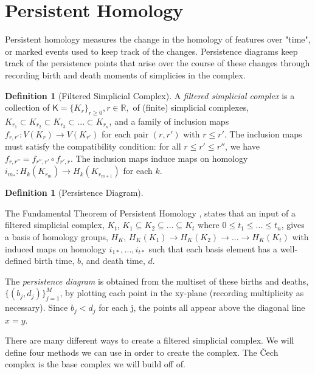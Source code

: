 \documentclass[ma]{uncgdissertationexp}
\theoremstyle{plain}
\theoremstyle{definition}
\newtheorem{definition}[theorem]{Definition}
\theoremstyle{remark}
\begin{document}
\section{Persistent Homology}
\par Persistent homology measures the change in the homology of features over "time", or marked events used to keep track of the changes. Persistence diagrams keep track of the persistence points that arise over the course of these changes through recording birth and death moments of simplicies in the complex.

\begin{definition}[Filtered Simplicial Complex]
\par A \textit{filtered simplicial complex} is a collection of $\mathsf{K}=\{K_{r}\}_{r\geq 0}, r\in \mathbb{R},$ of (finite) simplicial complexes, $K_{r_{1}} \subset K_{r_{2}} \subset K_{r_{3}} \subset ... \subset K_{r_{n}}$, and a family of inclusion maps $f_{r, r'}: V(K_{r})\rightarrow V(K_{r'})$ for each pair $(r, r')$ with $r \leq r'$. The inclusion maps must satisfy the compatibility condition: for all $r\leq r'\leq r''$, we have $f_{r, r''} = f_{r'', r'} \circ {f_{r', r}}$. The inclusion maps induce maps on homology $i_{m_{*}}: H_{k}(K_{r_{m}})\rightarrow H_{k}(K_{r_{m+1}})$ for each $k$.
\end{definition}

\begin{definition}[Persistence Diagram]
\label{def:persdia}
\par The Fundamental Theorem of Persistent Homology \cite{computpershom}, states that an input of a filtered simplicial complex, $K_t$,  $K_{1} \subseteq K_{2} \subseteq ... \subseteq K_{t}$ where $0\leq t_{1} \leq ... \leq t_{n} $, gives a basis of homology groups, $H_{K}$, $H_{K}(K_{1}) \rightarrow H_{K}(K_{2}) \rightarrow ...\rightarrow H_{K}(K_{t})$ with induced maps on homology $i_{1*}, ..., i_{t*}$ such that each basis element has a well-defined birth time, $b$, and death time, $d$.
\par The \textit{persistence diagram} is obtained from the multiset of these births and deaths, $\{(b_{j},d_{j})\}^{M}_{j=1}$, by plotting each point in the xy-plane (recording multiplicity as necessary). Since $b_{j} < d_{j}$ for each j, the points all appear above the diagonal line $x=y$.
\end{definition}

\par There are many different ways to create a filtered simplicial complex. We will define four methods we can use in order to create the complex. The Čech complex is the base complex we will build off of.
\end{document}
